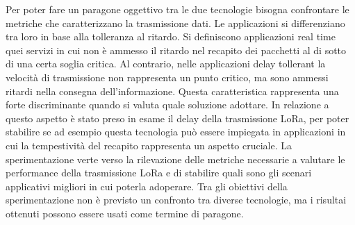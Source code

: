 \documentclass[12pt,a4paper,openright,twoside]{report}
\begin{document}
Per poter fare un paragone oggettivo tra le due tecnologie bisogna confrontare le metriche che caratterizzano la trasmissione dati. Le applicazioni si differenziano tra loro in base alla tolleranza al ritardo. Si definiscono applicazioni real time quei servizi in cui non \`e ammesso il ritardo nel recapito dei pacchetti al di sotto di una certa soglia critica. Al contrario, nelle applicazioni delay tollerant la velocit\`a di trasmissione non rappresenta un punto critico, ma sono ammessi ritardi nella consegna dell'informazione. Questa caratteristica rappresenta una forte discriminante quando si valuta quale soluzione adottare. In relazione a questo aspetto \`e stato preso in esame il delay della trasmissione LoRa, per poter stabilire se ad esempio questa tecnologia pu\`o essere impiegata in applicazioni in cui la tempestivit\`a del recapito rappresenta un aspetto cruciale.  
La sperimentazione verte verso la rilevazione delle metriche necessarie a valutare le performance della trasmissione LoRa e di stabilire quali sono gli scenari applicativi migliori in cui poterla adoperare.  
Tra gli obiettivi della sperimentazione non \`e previsto un confronto tra diverse tecnologie, ma i risultai ottenuti possono essere usati come termine di paragone.
\end{document}
